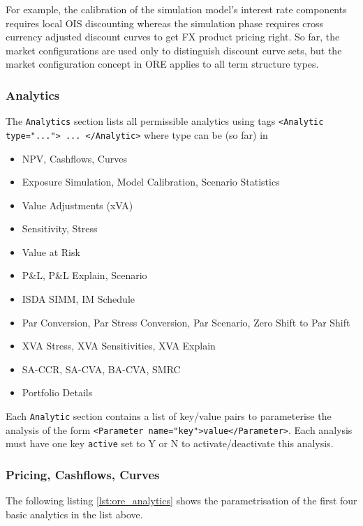 {For example, the calibration of the simulation model's interest rate components requires local OIS discounting whereas
the simulation phase requires cross currency adjusted discount curves to get FX product pricing right. So far, the
market configurations are used only to distinguish discount curve sets, but the market configuration concept in ORE
applies to all term structure types.

\subsubsection*{Analytics}\label{sec:analytics}

The {\tt Analytics} section lists all permissible analytics using tags {\tt <Analytic type="..."> ... </Analytic>} where
type can be (so far) in
\begin{itemize}
\item NPV, Cashflows, Curves
\item Exposure Simulation, Model Calibration, Scenario Statistics
\item Value Adjustments (xVA)
\item Sensitivity, Stress
\item Value at Risk
\item P\&L, P\&L Explain, Scenario
\item ISDA SIMM, IM Schedule
\item Par Conversion, Par Stress Conversion, Par Scenario, Zero Shift to Par Shift
\item XVA Stress, XVA Sensitivities, XVA Explain
\item SA-CCR, SA-CVA, BA-CVA, SMRC
\item Portfolio Details
\end{itemize}

Each {\tt Analytic} section contains a list of key/value pairs to parameterise the analysis of the form {\tt <Parameter
  name="key">value</Parameter>}. Each analysis must have one key {\tt active} set to Y or N to activate/deactivate this
analysis.

\subsubsection{Pricing, Cashflows, Curves}

The following listing \ref{lst:ore_analytics} shows the parametrisation of the first four basic analytics in
the list above.

}
